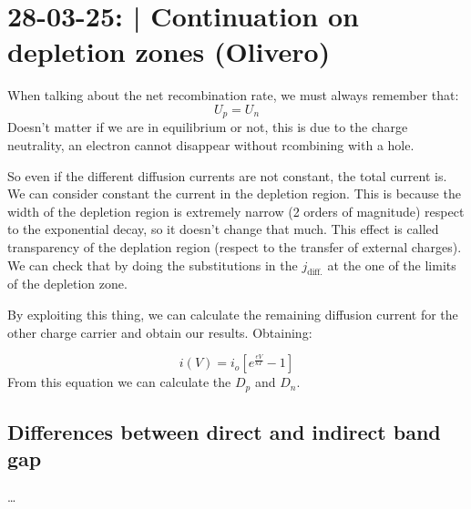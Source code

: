 \section{28-03-25: | Continuation on depletion zones (Olivero)}

When talking about the net recombination rate, we must always remember that:
\begin{equation}
    U_p = U_n
\end{equation}
Doesn't matter if we are in equilibrium or not, this is due to the charge neutrality, an electron cannot disappear without rcombining with a hole.

So even if the different diffusion currents are not constant, the total current is. We can consider constant the current in the depletion region. This is because the width of the depletion region is extremely narrow (2 orders of magnitude) respect to the exponential decay, so it doesn't change that much. This effect is called transparency of the deplation region (respect to the transfer of external charges). We can check that by doing the substitutions in the $j_{\text{diff.}}$ at the one of the limits of the depletion zone.

By exploiting this thing, we can calculate the remaining diffusion current for the other charge carrier and obtain our results. Obtaining:

\begin{equation}
    i(V) = i_o \left[e^{\frac{eV}{kT}} - 1\right]
\end{equation}
From this equation we can calculate the $D_p$ and $D_n$.

\subsection{Differences between direct and indirect band gap}
\dots
